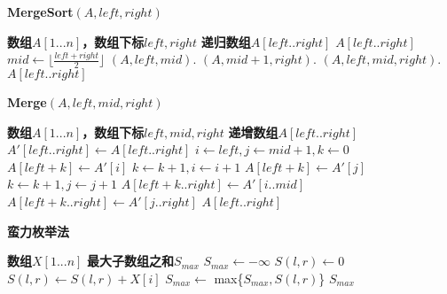 \documentclass{article}
\begin{document}
\begin{CJK}{UTF8}{gbsn}
        \begin{algorithm}
            \caption{\textbf{MergeSort$(A,left,right)$}}
            \begin{algorithmic}[1] %
                \Require \textbf{数组$A[1...n]$，数组下标$left,right$}
                \Ensure \textbf{递归数组$A[left..right]$}
                    \State \Return $A[left..right]$
                \EndIf
                \State $mid \leftarrow \lfloor \frac{left+right}{2} \rfloor$
                \State {}$(A,left,mid)$.
                \State {}$(A,mid+1,right)$.
                \State {}$(A,left,mid,right)$.
                \State \Return $A[left..right]$
            \end{algorithmic}
        \end{algorithm}

        \begin{algorithm}
            \caption{\textbf{Merge$(A,left,mid,right)$}}
            \begin{algorithmic}[1]
                \Require \textbf{数组$A[1...n]$，数组下标$left,mid,right$}
                \Ensure \textbf{递增数组$A[left..right]$}
                \State $A'[left..right] \leftarrow A[left..right]$
                \State $i \leftarrow left, j \leftarrow mid+1,k \leftarrow 0$
                        \State $A[left+k] \leftarrow A'[i]$
                        \State $k \leftarrow k+1, i \leftarrow i+1$
                    \Else
                        \State $A[left+k] \leftarrow A'[j]$
                        \State $k \leftarrow k+1, j \leftarrow j+1$
                    \EndIf
                \EndWhile
                    \State $A[left+k..right] \leftarrow A'[i..mid]$
                \Else
                    \State $A[left+k..right] \leftarrow A'[j..right]$
                \EndIf
                \State \Return $A[left..right]$
            \end{algorithmic}
        \end{algorithm}

    \begin{algorithm}
            \caption{\textbf{蛮力枚举法}}
            \begin{algorithmic}[1]
                \Require \textbf{数组$X[1...n]$}
                \Ensure \textbf{最大子数组之和$S_{max}$}
                \State $S_{max} \leftarrow -\infty$
                        \State $S(l,r) \leftarrow 0$
                            \State $S(l,r) \leftarrow S(l,r)+X[i]$
                        \EndFor
                        \State $S_{max} \leftarrow$ max\{$S_{max},S(l,r)$\}
                    \EndFor
                \EndFor
                \State \Return $S_{max}$
        \end{algorithmic}
    \end{algorithm}


\end{CJK}
\end{document}
